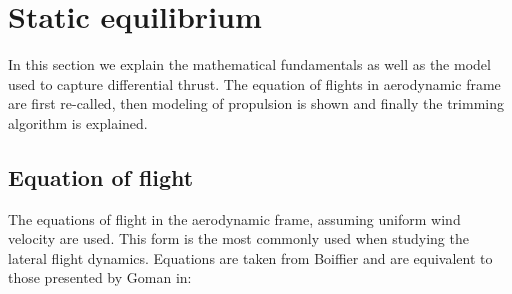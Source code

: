 \section{Static equilibrium}
In this section we explain the mathematical fundamentals as well as the model used to capture differential thrust. The equation of flights in aerodynamic frame are first re-called, then modeling of propulsion is shown and finally the trimming algorithm is explained.

\subsection{Equation of flight}
The equations of flight in the aerodynamic frame, assuming uniform wind velocity are used. This form is the most commonly used when studying the lateral flight dynamics. Equations are taken from Boiffier \cite{Boiffier} and are equivalent to those presented by Goman in\cite{GomanAttainableEqui}:
